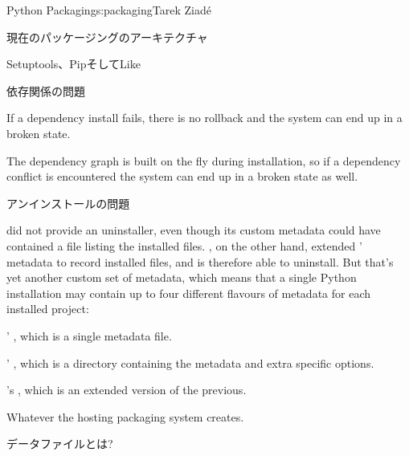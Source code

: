 \begin{aosachapter}{Python Packaging}{s:packaging}{Tarek Ziad\'{e}}
\begin{aosasect1}{現在のパッケージングのアーキテクチャ}
\begin{aosasect2}{Setuptools、PipそしてLike}
\begin{aosasect3}{依存関係の問題}
\begin{aosaitemize}
  \item If a dependency install fails, there is no rollback and the
  system can end up in a broken state.

  \item The dependency graph is built on the fly during installation, so
  if a dependency conflict is encountered the system can end up in a
  broken state as well.

\end{aosaitemize}

\end{aosasect3}

\begin{aosasect3}{アンインストールの問題}

 did not provide an uninstaller, even though its
custom metadata could have contained a file listing the installed
files.  , on the other hand, extended '
metadata to record installed files, and is therefore able to
uninstall.  But that's yet another custom set of metadata, which means
that a single Python installation may contain up to four different
flavours of metadata for each installed project:

\begin{aosaitemize}

  \item {}' , which is a single metadata
  file.

  \item {}' , which is a directory
  containing the metadata and extra  specific
  options.

  \item {}'s , which is an extended version of
  the previous.

  \item Whatever the hosting packaging system creates.

\end{aosaitemize}

\end{aosasect3}

\end{aosasect2}

\begin{aosasect2}{データファイルとは?}


\end{aosasect2}
\end{aosasect1}
\end{aosachapter}
